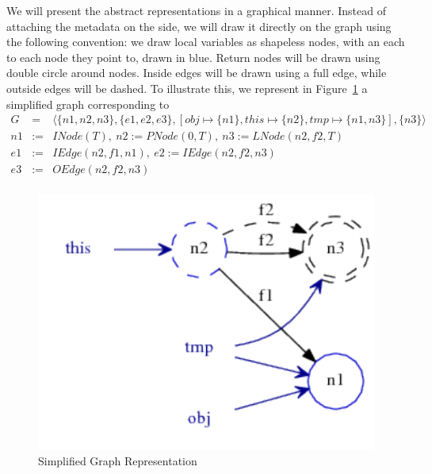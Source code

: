 We will present the abstract representations in a graphical manner. Instead of
attaching the metadata on the side, we will draw it directly on the graph using
the following convention: we draw local variables as shapeless nodes, with an
each to each node they point to, drawn in blue. Return nodes will be drawn
using double circle around nodes. Inside edges will be drawn using a full edge,
while outside edges will be dashed. To illustrate this, we represent in
Figure~\ref{fig:pt:graph1} a simplified graph corresponding to
\begin{eqnarray*}
    G &=& \langle \{n1, n2, n3 \}, \{ e1, e2, e3 \}, [ obj \mapsto \{n1\}, this \mapsto \{n2\}, tmp \mapsto \{ n1, n3 \} ], \{n3\} \rangle  \\
    n1 &:=& INode(T),~  n2 := PNode(0, T),~ n3 := LNode(n2, f2, T) \\
    e1 &:=& IEdge(n2, f1, n1),~ e2 := IEdge(n2, f2, n3) \\
    e3 &:=& OEdge(n2, f2, n3) \\
\end{eqnarray*}

\begin{figure}[h]
    \centering

    \includegraphics{images/pt_graph1}

    \caption{Simplified Graph Representation}
    \label{fig:pt:graph1}
\end{figure}

